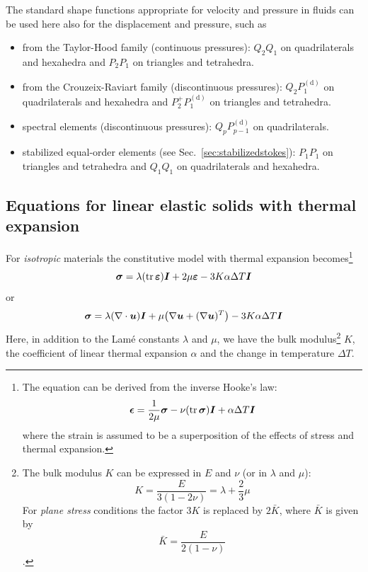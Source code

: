 The standard shape functions appropriate for velocity and pressure in fluids can be used here
also for the displacement and pressure, such as
\begin{itemize}
 \item from the Taylor-Hood
family (continuous pressures): $Q_2Q_1$ on quadrilaterals and hexahedra and
$P_2P_1$ on triangles and tetrahedra.
 \item from the Crouzeix-Raviart
family (discontinuous pressures): $Q_2P_1^{(\text{d})}$ on quadrilaterals
and hexahedra and $P_2^+P_1^{(\text{d})}$ on triangles and tetrahedra.
\item spectral elements (discontinuous pressures): $Q_pP_{p-1}^{(\text{d})}$ on
quadrilaterals.
\item stabilized equal-order elements (see Sec.~\ref{sec:stabilizedstokes}): $P_1P_1$ on triangles and tetrahedra and $Q_1Q_1$ on quadrilaterals and hexahedra.
\end{itemize}

\subsection{Equations for linear elastic solids with thermal expansion}
\label{sec:linear_elastic_eq_thermal}

For \emph{isotropic} materials the constitutive model with thermal expansion becomes\footnote{The equation can be derived from the inverse Hooke's law:
\[
   \boldsymbol{\epsilon} = \frac1{2\mu}\boldsymbol{\sigma}-\nu(\operatorname{tr}\boldsymbol{\sigma})\boldsymbol{I}+\alpha\Delta T\boldsymbol{I}
\]
where the strain is assumed to be a superposition of the effects of stress and thermal expansion.}
\begin{equation}
   \boldsymbol{\sigma} = \lambda(\operatorname{tr}\boldsymbol{\varepsilon})\boldsymbol{I}+2\mu\boldsymbol{\varepsilon}-3K\alpha\Delta T\boldsymbol{I}
\end{equation}
or
\begin{equation}
 \boldsymbol{\sigma} = \lambda(\nabla\cdot\boldsymbol{u})\boldsymbol{I}+\mu\big(\nabla\boldsymbol{u}+(\nabla\boldsymbol{u})^T\big) -3K\alpha\Delta T\boldsymbol{I}
\label{eq:Hooke2}
\end{equation}
Here, in addition to the Lam\'e constants $\lambda$ and $\mu$, we have the bulk modulus\footnote{The bulk modulus $K$ can be expressed in 
 $E$ and $\nu$ (or in $\lambda$ and $\mu$):
\[ K=\frac{E}{3(1-2\nu)}=\lambda+\frac23\mu\]
For \emph{plane stress} conditions the factor $3K$ is replaced by
$2\bar K$, where $\bar K$ is given by
\[\bar K=\frac{E}{2(1-\nu)}\].} $K$, the coefficient of linear thermal expansion $\alpha$ and the change in temperature $\Delta T$.

